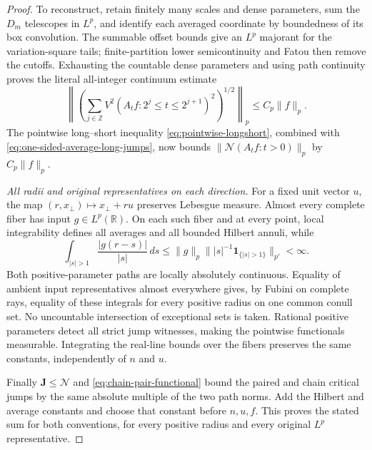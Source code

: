 \documentclass[11pt]{article}
\numberwithin{equation}{section}
\theoremstyle{remark}
\theoremstyle{definition}
\newcommand{\R}{\mathbb R}
\newcommand{\NN}{\mathcal N}
\begin{document}
\begin{proof}
To reconstruct, retain finitely many scales and dense parameters,
sum the $D_m$ telescopes in $L^p$, and identify each averaged
coordinate by boundedness of its box convolution.  The summable
offset bounds give an $L^p$ majorant for the variation-square tails;
finite-partition lower semicontinuity and Fatou then remove the cutoffs.
Exhausting the countable dense parameters and using path continuity
proves the literal all-integer continuum estimate
\begin{equation}\label{eq:one-sided-average-short-square}
 \left\|\left(\sum_{j\in\mathbb Z}
 V^2(A_tf:2^j\le t\le2^{j+1})^2\right)^{1/2}\right\|_p
 \le C_p\|f\|_p.
\end{equation}
The pointwise long--short inequality \eqref{eq:pointwise-longshort},
combined with \eqref{eq:one-sided-average-long-jumps}, now bounds
$\|\NN(A_tf:t>0)\|_p$ by $C_p\|f\|_p$.

\smallskip\noindent
\emph{All radii and original representatives on each direction.}
For a fixed unit vector $u$, the map
$(r,x_\perp)\mapsto x_\perp+ru$ preserves Lebesgue measure.
Almost every complete fiber has input $g\in L^p(\R)$.
On each such fiber and at every point, local integrability defines
all averages and all bounded Hilbert annuli, while
\[
 \int_{|s|>1}\frac{|g(r-s)|}{|s|}\,ds
 \le\|g\|_p\bigl\||s|^{-1}\mathbf1_{\{|s|>1\}}\bigr\|_{p'}<\infty.
\]
Both positive-parameter paths are locally absolutely continuous.
Equality of ambient input representatives almost everywhere gives,
by Fubini on complete rays, equality of these integrals for every
positive radius on one common conull set.  No uncountable intersection
of exceptional sets is taken.  Rational positive parameters detect
all strict jump witnesses, making the pointwise functionals measurable.
Integrating the real-line bounds over the fibers preserves the same
constants, independently of $n$ and $u$.

Finally $\mathbf J\le\NN$ and
\eqref{eq:chain-pair-functional} bound the paired and chain critical
jumps by the same absolute multiple of the two path norms.
Add the Hilbert and average constants and choose that constant before
$n,u,f$.  This proves the stated sum for both conventions, for every
positive radius and every original $L^p$ representative.
\end{proof}
\end{document}
